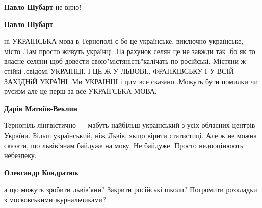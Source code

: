 \begin{itemize}
\begin{itemize}
 
\textbf{Павло Шубарт} не вірю!

 
\textbf{Павло Шубарт} 

ні УКРАІНСЬКА мова в Тернополі є бо це українське, виключно українське, місто
.Там просто живуть українці .На рахунок селян це не завжди так ,бо як то власне
селяни щоб довести свою"містяність"калічать по російські. Містяни ж стійкі
,свідомі УКРАІНЦІ. І ЦЕ Ж У ЛЬВОВІ., ФРАНКІВСЬКУ І У ВСІЙ ЗАХІДНіЙ УКРАЇНІ .Ми
УКРАІНЦІ і цим все сказано .Можуть бути помилки чи русизм але це перш за все
УКРАЇГСЬКА МОВА.


 
\textbf{Дарія Матвіїв-Веклин} 

Тернопіль лінгвістично — мабуть найбільш український з усіх обласних центрів
України. Більш український, ніж Львів, якщо вірити статистиці. Але ж не можна
сказати, що львів'янам байдуже на мову. Не байдуже. Просто недооцінюють
небезпеку.


 
\textbf{Олександр Кондратюк} 

а що можуть зробити львів'яни? Закрити російські школи? Погромити розкладки з
московськими журнальчиками?

 

\end{itemize}
\end{itemize}
